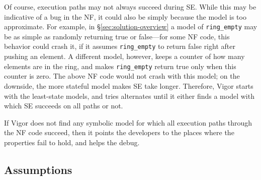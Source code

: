 \documentclass[letterpaper,twocolumn,10pt]{article}
\newcommand{\code}[1]{\lstinline{#1}}
\begin{document}
Of course, execution paths may not always succeed during SE. While this may be
indicative of a bug in the NF, it could also be simply because the model is too
approximate. For example, in \S\ref{sec:solution-overview} a model of
\code{ring_empty} may be as simple as randomly returning true or false---for
some NF code, this behavior could crash it, if it assumes \code{ring_empty} to
return false right after pushing an element. A different model, however, keeps a
counter of how many elements are in the ring, and makes \code{ring_empty} return
true only when this counter is zero. The above NF code would not crash with this
model; on the downside, the more stateful model makes SE take longer. Therefore,
Vigor starts with the least-state models, and tries alternates until it either
finds a model with which SE succeeds on all paths or not.

If Vigor does not find any symbolic model for which all execution paths through
the NF code succeed, then it points the developers to the places where the
properties fail to hold, and helps the debug.




%     

\subsection{Assumptions}
\label{sec:assumptions}
\end{document}
